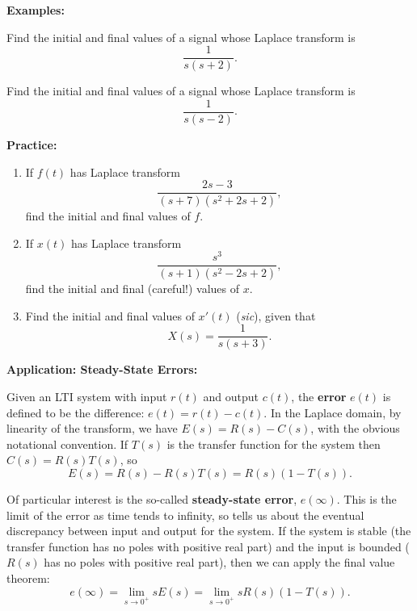 \documentclass{article}
\begin{document}
\textbf{Examples:}\bigskip

Find the initial and final values of a signal whose Laplace transform is
\[\frac{1}{s(s+2)}.\]

\vfill

Find the initial and final values of a signal whose Laplace transform is
\[\frac{1}{s(s-2)}.\]







\clearpage













\textbf{Practice:}\bigskip


\begin{enumerate}
	\item If $f(t)$ has Laplace transform
		\[\frac{2s-3}{(s+7)(s^2+2s+2)},\]
		find the initial and final values of $f$.
	\item If $x(t)$ has Laplace transform
		\[\frac{s^3}{(s+1)(s^2-2s+2)},\]
		find the initial and final (careful!) values of $x$.
	\item Find the initial and final values of $x'(t)$ (\textit{sic}), given that 
		\[X(s)=\frac{1}{s(s+3)}.\]
\end{enumerate}


\clearpage







\textbf{Application: Steady-State Errors:}\bigskip



Given an LTI system with input $r(t)$ and output $c(t)$, the \textbf{error} $e(t)$ is defined to be the difference: $e(t)=r(t)-c(t)$. In the Laplace domain, by linearity of the transform, we have $E(s)=R(s)-C(s)$, with the obvious notational convention. If $T(s)$ is the transfer function for the system then $C(s)=R(s)T(s)$, so
\[E(s)=R(s)-R(s)T(s)=R(s)(1-T(s)).\]

Of particular interest is the so-called \textbf{steady-state error}, $e(\infty)$. This is the limit of the error as time tends to infinity, so tells us about the eventual discrepancy between input and output for the system. If the system is stable (the transfer function has no poles with positive real part) and the input is bounded ($R(s)$ has no poles with positive real part), then we can apply the final value theorem:
\[e(\infty)=\lim_{s\to 0^+}sE(s)=\lim_{s\to 0^+} sR(s)(1-T(s)).\]
\end{document}
